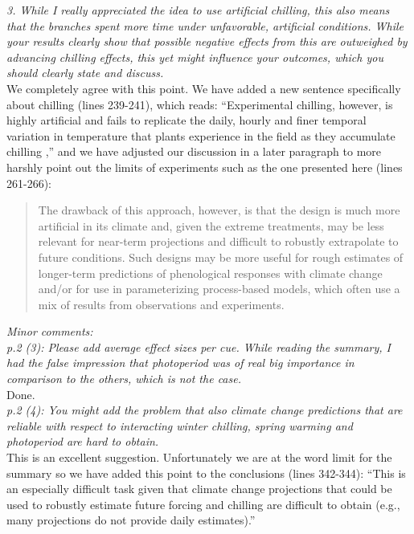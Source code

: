 \documentclass[11pt,a4paper]{article}
\begin{document}
\emph{3.  While I really appreciated the idea to use artificial chilling, this also means that
the branches spent more time under unfavorable, artificial conditions. While your results
clearly show that possible negative effects from this are outweighed by advancing chilling
effects, this yet might influence your outcomes, which you should clearly state and discuss.}\\

We completely agree with this point. We have added a new sentence specifically about chilling (lines 239-241), which reads: ``Experimental chilling, however, is highly artificial and fails to replicate the daily, hourly and finer temporal variation in temperature that plants experience in the field as they accumulate chilling \citep{Erez:1988,Luedeling:2009},'' and we have adjusted our discussion in a later paragraph to more harshly point out the limits of experiments such as the one presented here (lines 261-266):

\begin{quote}
The drawback of this approach, however, is that the design is much more artificial in its climate and, given the extreme treatments, may be less relevant for near-term projections and difficult to robustly extrapolate to future conditions. Such designs may be more useful for rough estimates of longer-term predictions of phenological responses with climate change and/or for use in parameterizing process-based models, which often use a mix of results from observations and experiments.
\end{quote}

\emph{Minor comments:\\
p.2 (3): Please add average effect sizes per cue. While reading the summary, I had the false
impression that photoperiod was of real big importance in comparison to the others, which is
not the case.}\\

Done.\\

\emph{p.2 (4): You might add the problem that also climate change predictions that are reliable
with respect to interacting winter chilling, spring warming and photoperiod are hard to
obtain.}\\

This is an excellent suggestion. Unfortunately we are at the word limit for the summary so we have added this point to the conclusions (lines 342-344): ``This is an especially difficult task given that climate change projections that could be used to robustly estimate future forcing and chilling are difficult to obtain (e.g., many projections do not provide daily estimates).''\\
\end{document}
